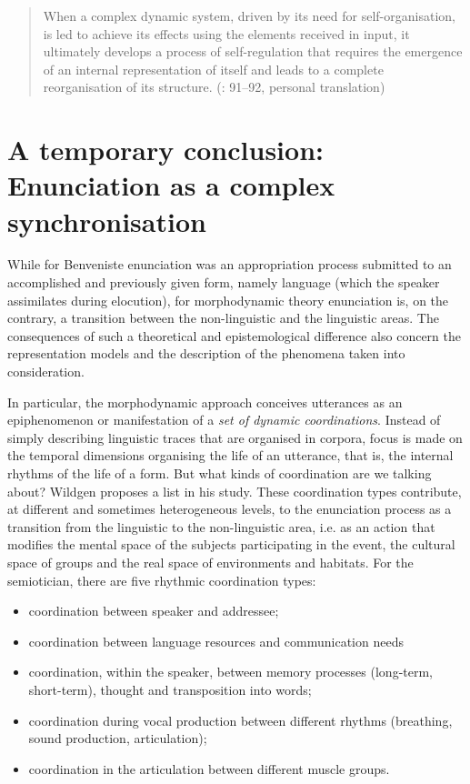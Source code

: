 \documentclass[output=paper]{langscibook}
\begin{document}
\begin{quote}
When a complex dynamic system, driven by its need for self-organisation, is led to achieve its effects using the elements received in input, it ultimately develops a process of self-regulation that requires the emergence of an internal representation of itself and leads to a complete reorganisation of its structure. (\citealt{Virole2019}: 91--92, personal translation)
\end{quote}


\section{A temporary conclusion: Enunciation as a complex synchronisation} 

While for Benveniste enunciation was an appropriation process submitted to an accomplished and previously given form, namely language (which the speaker assimilates during elocution), for morphodynamic theory enunciation is, on the contrary, a transition between the non-linguistic and the linguistic areas. The consequences of such a theoretical and epistemological difference also concern the representation models and the description of the phenomena taken into consideration. 

In particular, the morphodynamic approach conceives utterances as an epiphenomenon or manifestation of a \textit{set of dynamic coordinations}. Instead of simply describing linguistic traces that are organised in corpora, focus is made on the temporal dimensions organising the life of an utterance, that is, the internal rhythms of the life of a form. But what kinds of coordination are we talking about? Wildgen proposes a list in his study. These coordination types contribute, at different and sometimes heterogeneous levels, to the enunciation process as a transition from the linguistic to the non-linguistic area, i.e. as an action that modifies the mental space of the subjects participating in the event, the cultural space of groups and the real space of environments and habitats. For the semiotician, there are five rhythmic coordination types: 

\begin{itemize}
\item coordination between speaker and addressee;

\item coordination between language resources and communication needs

\item coordination, within the speaker, between memory processes (long-term, short-term), thought and transposition into words;

\item coordination during vocal production between different rhythms (breathing, sound production, articulation);

\item coordination in the articulation between different muscle groups.

\end{itemize}
\end{document}
